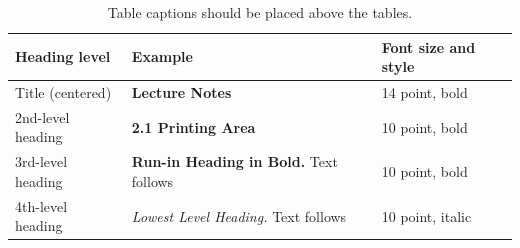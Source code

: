 \begin{table}
    \caption{Table captions should be placed above the
        tables.}\label{tab1}
    \begin{tabular}{|l|l|l|}
        \hline
        Heading level     & Example                                          & Font size and style \\
        \hline
        Title (centered)  & {\Large\bfseries Lecture Notes}                  & 14 point, bold      \\
        2nd-level heading & {\bfseries 2.1 Printing Area}                    & 10 point, bold      \\
        3rd-level heading & {\bfseries Run-in Heading in Bold.} Text follows & 10 point, bold      \\
        4th-level heading & {\itshape Lowest Level Heading.} Text follows    & 10 point, italic    \\
        \hline
    \end{tabular}
\end{table}